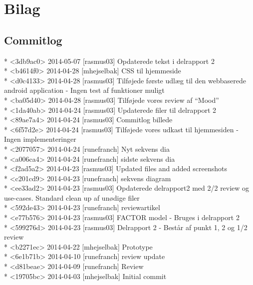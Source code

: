 \documentclass[12pt]{article}
\begin{document}
\newpage

\section{Bilag}

\subsection{Commitlog}
* <3db9ac0> 2014-05-07 [rasmus03]  Opdaterede tekst i delrapport 2\\
* <b4614f0> 2014-04-28 [mhejselbak]  CSS til hjemmeside\\
* <d0c4133> 2014-04-28 [rasmus03]  Tilføjede første udlæg til den webbaserede android application - Ingen test af funktioner muligt \\
* <ba05d40> 2014-04-28 [rasmus03]  Tilføjede vores review af “Mood”\\
* <1da40ab> 2014-04-24 [rasmus03]  Updaterede filer til delrapport 2\\
* <89ae7a4> 2014-04-24 [rasmus03]  Commitlog billede\\
* <6f57d2e> 2014-04-24 [rasmus03]  Tilføjede vores udkast til hjemmesiden - Ingen implementeringer\\
* <2077057> 2014-04-24 [runefranch]  Nyt sekvens dia\\
* <a006ca4> 2014-04-24 [runefranch]  sidste sekvens dia\\
* <f2ad5a2> 2014-04-23 [rasmus03]  Updated files and added screenshots\\
* <c201cd9> 2014-04-23 [runefranch]  sekvens diagram\\
* <ee33ad2> 2014-04-23 [rasmus03]  Opdaterede delrapport2 med 2/2 review og use-cases. Standard clean up af unødige filer\\
* <592de43> 2014-04-23 [runefranch]  reviewartikel\\
* <e77b576> 2014-04-23 [rasmus03]  FACTOR model - Bruges i delrapport 2\\
* <599276d> 2014-04-23 [rasmus03]  Delrapport 2 - Består af punkt 1, 2 og 1/2 review\\
* <b2271ec> 2014-04-22 [mhejselbak]  Prototype\\
* <6e1b71b> 2014-04-10 [runefranch]  review update\\
* <d81beae> 2014-04-09 [runefranch]  Review\\
* <19705bc> 2014-04-03 [mhejselbak]  Initial commit\\
\end{document}
